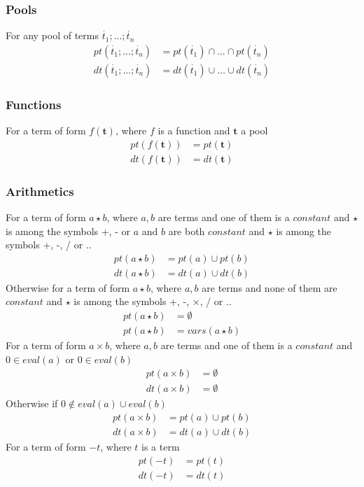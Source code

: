 \documentclass{article}
\newcommand{\pool}[1]{\boldsymbol{#1}}
\newcommand{\tuple}[1]{\dot{#1}}
\begin{document}
	\subsubsection{Pools}
	For any pool of terms $\tuple{t_1};...;\tuple{t_n}$
	\begin{align*}
		pt(\tuple{t_1};...;\tuple{t_n}) &= pt(\tuple{t_1}) \cap \dots \cap pt(\tuple{t_n}) \\
		dt(\tuple{t_1};...;\tuple{t_n}) &= dt(\tuple{t_1}) \cup \dots \cup dt(\tuple{t_n})
	\end{align*}

	\subsubsection{Functions}
	For a term of form $f(\pool{t})$, where $f$ is a function and $\pool{t}$ a pool
	\begin{align*}
		pt(f(\pool{t})) &= pt(\pool{t}) \\
		dt(f(\pool{t})) &= dt(\pool{t})
	\end{align*}
	\subsubsection{Arithmetics}
	For a term of form $a \star b$, where $a,b$ are terms and one of them is a $\mathit{constant}$ and $\star$ is among the symbols +, - or $a$ and $b$ are both $\mathit{constant}$ and $\star$ is among the symbols +, -, / or ..
	\begin{align*}
		pt(a \star b) &= pt(a) \cup pt(b) \\
		dt(a \star b) &= dt(a) \cup dt(b)
	\end{align*}
	Otherwise for a term of form $a \star b$, where $a,b$ are terms and none of them are $\mathit{constant}$ and $\star$ is among the symbols +, -, $\times$, / or ..
	\begin{align*}
		pt(a \star b) &= \emptyset \\
		pt(a \star b) &= vars(a \star b)
	\end{align*}
	For a term of form $a \times b$, where $a,b$ are terms and one of them is a $\mathit{constant}$ and $0 \in \mathit{eval}(a)$ or $0 \in \mathit{eval}(b)$
	\begin{align*}
		pt(a \times b) &= \emptyset \\
		dt(a \times b) &= \emptyset
	\end{align*}
	Otherwise if $0 \notin eval(a) \cup eval(b)$
	\begin{align*}
		pt(a \times b) &= pt(a) \cup pt(b) \\
		dt(a \times b) &= dt(a) \cup dt(b)
	\end{align*}
	For a term of form $-t$, where $t$ is a term
	\begin{align*}
		pt(-t) &= pt(t) \\
		dt(-t) &= dt(t)
	\end{align*}
\end{document}
